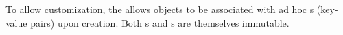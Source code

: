 \documentclass{sig-alternate}
\begin{document}
To allow customization, the \core allows \version objects to be associated with
ad hoc {\gtag}s (key-value pairs) upon creation.
Both {\version}s and {\gtag}s are themselves immutable.






 
\end{document}
